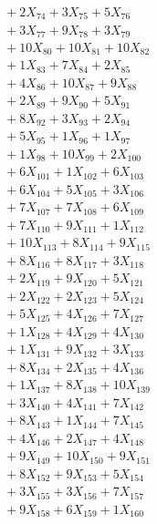 \documentclass[a4paper,10pt]{article}
\begin{document}
{\begin{align}
&\;  + 2 X_{74} + 3 X_{75} + 5 X_{76} \\[0.3ex]
&\;  + 3 X_{77} + 9 X_{78} + 3 X_{79} \\[0.3ex]
&\;  + 10 X_{80} + 10 X_{81} + 10 X_{82} \\[0.3ex]
&\;  + 1 X_{83} + 7 X_{84} + 2 X_{85} \\[0.3ex]
&\;  + 4 X_{86} + 10 X_{87} + 9 X_{88} \\[0.3ex]
&\;  + 2 X_{89} + 9 X_{90} + 5 X_{91} \\[0.3ex]
&\;  + 8 X_{92} + 3 X_{93} + 2 X_{94} \\[0.3ex]
&\;  + 5 X_{95} + 1 X_{96} + 1 X_{97} \\[0.3ex]
&\;  + 1 X_{98} + 10 X_{99} + 2 X_{100} \\[0.3ex]
&\;  + 6 X_{101} + 1 X_{102} + 6 X_{103} \\[0.5ex]\allowbreak
&\;  + 6 X_{104} + 5 X_{105} + 3 X_{106} \\[0.3ex]
&\;  + 7 X_{107} + 7 X_{108} + 6 X_{109} \\[0.3ex]
&\;  + 7 X_{110} + 9 X_{111} + 1 X_{112} \\[0.3ex]
&\;  + 10 X_{113} + 8 X_{114} + 9 X_{115} \\[0.3ex]
&\;  + 8 X_{116} + 8 X_{117} + 3 X_{118} \\[0.3ex]
&\;  + 2 X_{119} + 9 X_{120} + 5 X_{121} \\[0.3ex]
&\;  + 2 X_{122} + 2 X_{123} + 5 X_{124} \\[0.3ex]
&\;  + 5 X_{125} + 4 X_{126} + 7 X_{127} \\[0.3ex]
&\;  + 1 X_{128} + 4 X_{129} + 4 X_{130} \\[0.3ex]
&\;  + 1 X_{131} + 9 X_{132} + 3 X_{133} \\[0.5ex]\allowbreak
&\;  + 8 X_{134} + 2 X_{135} + 4 X_{136} \\[0.3ex]
&\;  + 1 X_{137} + 8 X_{138} + 10 X_{139} \\[0.3ex]
&\;  + 3 X_{140} + 4 X_{141} + 7 X_{142} \\[0.3ex]
&\;  + 8 X_{143} + 1 X_{144} + 7 X_{145} \\[0.3ex]
&\;  + 4 X_{146} + 2 X_{147} + 4 X_{148} \\[0.3ex]
&\;  + 9 X_{149} + 10 X_{150} + 9 X_{151} \\[0.3ex]
&\;  + 8 X_{152} + 9 X_{153} + 5 X_{154} \\[0.3ex]
&\;  + 3 X_{155} + 3 X_{156} + 7 X_{157} \\[0.3ex]
&\;  + 9 X_{158} + 6 X_{159} + 1 X_{160} \\[0.3ex]

\end{align}}
\end{document}
